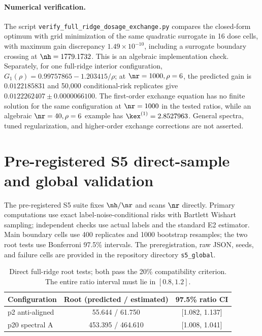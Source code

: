\paragraph{Numerical verification.}
The script \texttt{verify\_full\_ridge\_dosage\_exchange.py} compares the closed-form optimum with grid minimization of the same quadratic surrogate in 16 dose cells, with maximum gain discrepancy $1.49\times10^{-10}$, including a surrogate boundary crossing at $\nh=1779.1732$. This is an algebraic implementation check. Separately, for one full-ridge interior configuration, $G_1(\rho)=0.99757865-1.203415/\rho$; at $\nr=1000,\rho=6$, the predicted gain is $0.0122185831$ and 50{,}000 conditional-risk replicates give $0.0122262407\pm0.0000066100$. The first-order exchange equation has no finite solution for the same configuration at $\nr=1000$ in the tested ratios, while an algebraic $\nr=40,\rho=6$ example has $\kex^{(1)}=2.8527963$. General spectra, tuned regularization, and higher-order exchange corrections are not asserted.

\section{Pre-registered S5 direct-sample and global validation}
\label{supp:s5}

The pre-registered S5 suite fixes $\nh/\nr$ and scans $\nr$ directly. Primary computations use exact label-noise-conditional risks with Bartlett Wishart sampling; independent checks use actual labels and the standard E2 estimator. Main boundary cells use 400 replicates and 1000 bootstrap resamples; the two root tests use Bonferroni 97.5\% intervals. The preregistration, raw JSON, seeds, and failure cells are provided in the repository directory \texttt{s5\_global}.

\begin{table}[h]
  \centering
  \footnotesize
  \caption{Direct full-ridge root tests; both pass the 20\% compatibility criterion. The entire ratio interval must lie in $[0.8,1.2]$.}
  \label{supp:tab:s5roots}
  \begin{tabular}{lcc}
    \toprule
    Configuration & Root (predicted / estimated) & 97.5\% ratio CI \\
    \midrule
    p2 anti-aligned & 55.644 / 61.750 & [1.082, 1.137] \\
    p20 spectral A & 453.395 / 464.610 & [1.008, 1.041] \\
    \bottomrule
  \end{tabular}
\end{table}

